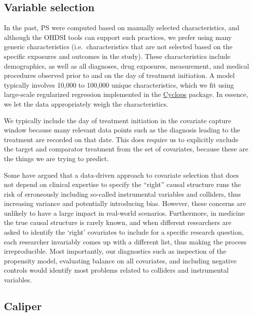 \documentclass[11pt]{book}
\theoremstyle{definition}
\theoremstyle{definition}
\theoremstyle{definition}
\theoremstyle{remark}
\let\BeginKnitrBlock\begin \let\EndKnitrBlock\end
\begin{document}
\hypertarget{VariableSelection}{%
\subsection{Variable selection}\label{VariableSelection}}

In the past, PS were computed based on manually selected characteristics, and although the OHDSI tools can support such practices, we prefer using many generic characteristics (i.e.~characteristics that are not selected based on the specific exposures and outcomes in the study). \citep{tian_2018} These characteristics include demographics, as well as all diagnoses, drug exposures, measurement, and medical procedures observed prior to and on the day of treatment initiation. A model typically involves 10,000 to 100,000 unique characteristics, which we fit using large-scale regularized regression \citep{suchard_2013} implemented in the \href{https://ohdsi.github.io/Cyclops/}{Cyclops} package. In essence, we let the data appropriately weigh the characteristics.

\BeginKnitrBlock{rmdimportant}
We typically include the day of treatment initiation in the covariate capture window because many relevant data points such as the diagnosis leading to the treatment are recorded on that date. This does require us to explicitly exclude the target and comparator treatment from the set of covariates, because these are the things we are trying to predict.
\EndKnitrBlock{rmdimportant}

Some have argued that a data-driven approach to covariate selection that does not depend on clinical expertise to specify the ``right'' causal structure runs the risk of erroneously including so-called instrumental variables and colliders, thus increasing variance and potentially introducing bias. \citep{hernan_2002} However, these concerns are unlikely to have a large impact in real-world scenarios. \citep{schneeweiss_2018} Furthermore, in medicine the true causal structure is rarely known, and when different researchers are asked to identify the `right' covariates to include for a specific research question, each researcher invariably comes up with a different list, thus making the process irreproducible. Most importantly, our diagnostics such as inspection of the propensity model, evaluating balance on all covariates, and including negative controls would identify most problems related to colliders and instrumental variables.

\hypertarget{caliper}{%
\subsection{Caliper}\label{caliper}}
\end{document}
